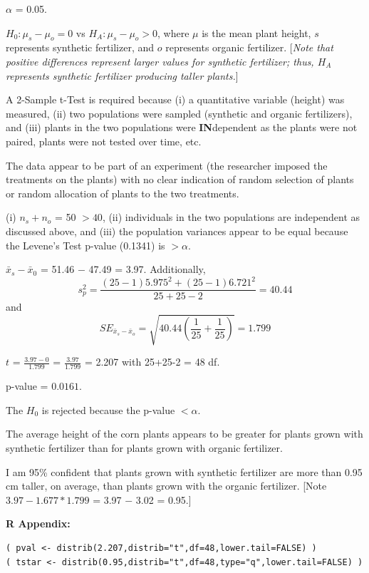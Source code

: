 \documentclass[10pt,openany]{book}\usepackage[]{graphicx}\usepackage[]{color}
\makeatletter
\newenvironment{kframe}{%
 \def\at@end@of@kframe{}%
 \ifinner\ifhmode%
  \def\at@end@of@kframe{\end{minipage}}%
  \begin{minipage}{\columnwidth}%
 \fi\fi%
 \def\FrameCommand##1{\hskip\@totalleftmargin \hskip-\fboxsep
 \colorbox{shadecolor}{##1}\hskip-\fboxsep
     \hskip-\linewidth \hskip-\@totalleftmargin \hskip\columnwidth}%
 \MakeFramed {\advance\hsize-\width
   \@totalleftmargin\z@ \linewidth\hsize
   \@setminipage}}%
 {\par\unskip\endMakeFramed%
 \at@end@of@kframe}
\newenvironment{knitrout}{}{} %
\makeatother
\begin{document}
\begin{Enumerate}
  \item $\alpha$ = 0.05.
  \item $H_{0}:\mu_{s}-\mu_{o} = 0$ vs $H_{A}:\mu_{s}-\mu_{o} > 0$, where $\mu$ is the mean plant height, $s$ represents synthetic fertilizer, and $o$ represents organic fertilizer. [\textit{Note that positive differences represent larger values for synthetic fertilizer; thus, $H_{A}$ represents synthetic fertilizer producing taller plants.}]
  \item A 2-Sample t-Test is required because (i) a quantitative variable (height) was measured, (ii) two populations were sampled (synthetic and organic fertilizers), and (iii) plants in the two populations were \textbf{IN}dependent as the plants were not paired, plants were not tested over time, etc.
  \item The data appear to be part of an experiment (the researcher imposed the treatments on the plants) with no clear indication of random selection of plants or random allocation of plants to the two treatments.
  \item (i) $n_{s}+n_{o}$ = 50 $> 40$, (ii) individuals in the two populations are independent as discussed above, and (iii) the population variances appear to be equal because the Levene's Test p-value (0.1341) is $> \alpha$.
  \item $\bar{x}_{s}-\bar{x}_{0}$ = 51.46 $-$ 47.49 = 3.97. Additionally,
    \[s_{p}^{2}=\frac{(25-1)5.975^{2}+(25-1)6.721^{2}}{25+25-2} = 40.44 \]
and
    \[ SE_{\bar{x}_{s}-\bar{x}_{o}}=\sqrt{40.44\left(\frac{1}{25}+\frac{1}{25} \right)} = 1.799  \]
  \item $t$ = $\frac{3.97-0}{1.799}$ = $\frac{3.97}{1.799}$ = 2.207 with 25+25-2 = 48 df.
  \item p-value = $0.0161$.
  \item The $H_{0}$ is rejected because the p-value $< \alpha$.
  \item The average height of the corn plants appears to be greater for plants grown with synthetic fertilizer than for plants grown with organic fertilizer.
  \item I am 95\% confident that plants grown with synthetic fertilizer are more than 0.95 cm taller, on average, than plants grown with the organic fertilizer. [Note $3.97-1.677*1.799$ = 3.97 $-$ 3.02 = 0.95.]
\end{Enumerate}

\begin{minipage}{\textwidth}
\textbf{R Appendix:}
\vspace{-6pt}
\begin{knitrout}
\color{fgcolor}\begin{kframe}
\begin{verbatim}
( pval <- distrib(2.207,distrib="t",df=48,lower.tail=FALSE) )
( tstar <- distrib(0.95,distrib="t",df=48,type="q",lower.tail=FALSE) )
\end{verbatim}
\end{kframe}
\end{knitrout}
\end{minipage}
\end{document}
